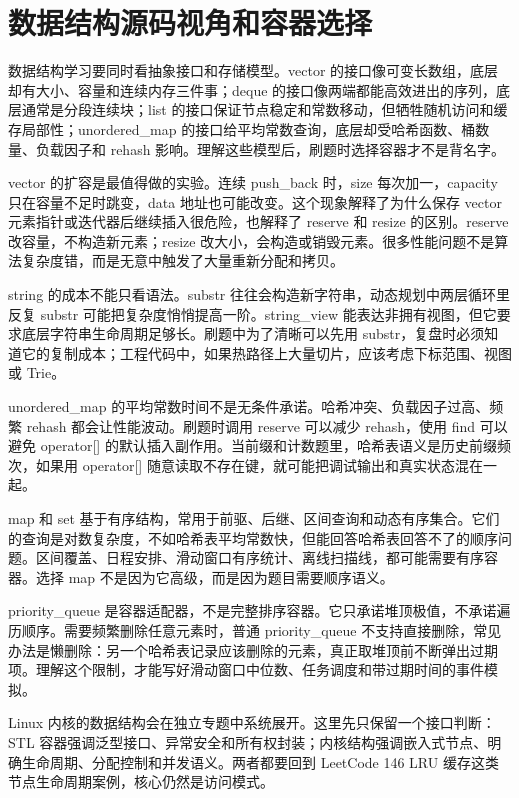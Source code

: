 \section{数据结构源码视角和容器选择}

数据结构学习要同时看抽象接口和存储模型。vector 的接口像可变长数组，底层却有大小、容量和连续内存三件事；deque 的接口像两端都能高效进出的序列，底层通常是分段连续块；list 的接口保证节点稳定和常数移动，但牺牲随机访问和缓存局部性；unordered\_map 的接口给平均常数查询，底层却受哈希函数、桶数量、负载因子和 rehash 影响。理解这些模型后，刷题时选择容器才不是背名字。

vector 的扩容是最值得做的实验。连续 push\_back 时，size 每次加一，capacity 只在容量不足时跳变，data 地址也可能改变。这个现象解释了为什么保存 vector 元素指针或迭代器后继续插入很危险，也解释了 reserve 和 resize 的区别。reserve 改容量，不构造新元素；resize 改大小，会构造或销毁元素。很多性能问题不是算法复杂度错，而是无意中触发了大量重新分配和拷贝。

string 的成本不能只看语法。substr 往往会构造新字符串，动态规划中两层循环里反复 substr 可能把复杂度悄悄提高一阶。string\_view 能表达非拥有视图，但它要求底层字符串生命周期足够长。刷题中为了清晰可以先用 substr，复盘时必须知道它的复制成本；工程代码中，如果热路径上大量切片，应该考虑下标范围、视图或 Trie。

unordered\_map 的平均常数时间不是无条件承诺。哈希冲突、负载因子过高、频繁 rehash 都会让性能波动。刷题时调用 reserve 可以减少 rehash，使用 find 可以避免 operator[] 的默认插入副作用。当前缀和计数题里，哈希表语义是历史前缀频次，如果用 operator[] 随意读取不存在键，就可能把调试输出和真实状态混在一起。

map 和 set 基于有序结构，常用于前驱、后继、区间查询和动态有序集合。它们的查询是对数复杂度，不如哈希表平均常数快，但能回答哈希表回答不了的顺序问题。区间覆盖、日程安排、滑动窗口有序统计、离线扫描线，都可能需要有序容器。选择 map 不是因为它高级，而是因为题目需要顺序语义。

priority\_queue 是容器适配器，不是完整排序容器。它只承诺堆顶极值，不承诺遍历顺序。需要频繁删除任意元素时，普通 priority\_queue 不支持直接删除，常见办法是懒删除：另一个哈希表记录应该删除的元素，真正取堆顶前不断弹出过期项。理解这个限制，才能写好滑动窗口中位数、任务调度和带过期时间的事件模拟。

Linux 内核的数据结构会在独立专题中系统展开。这里先只保留一个接口判断：STL 容器强调泛型接口、异常安全和所有权封装；内核结构强调嵌入式节点、明确生命周期、分配控制和并发语义。两者都要回到 LeetCode 146 LRU 缓存这类节点生命周期案例，核心仍然是访问模式。

